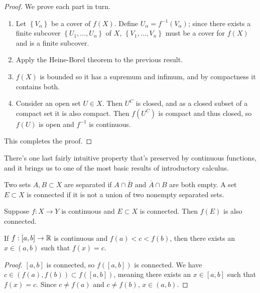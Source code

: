 \documentclass[../m131main.tex]{subfiles}
\begin{document}
\begin{proof}
    We prove each part in turn.
    \begin{enumerate}[label=(\alph*)]
        \item Let $\left\{ V_\alpha \right\}$ be a cover of $f(X)$.
        Define $U_\alpha = f^{-1}(V_\alpha)$; since there exists a finite subcover $\left\{ U_1, \ldots, U_n \right\}$ of $X$, $\left\{ V_1, \ldots, V_n \right\}$ must be a cover for $f(X)$ and is a finite subcover.

        \item Apply the Heine-Borel theorem to the previous result.

        \item $f(X)$ is bounded so it has a supremum and infimum, and by compactness it contains both.

        \item Consider an open set $U \in X$.
        Then $U^C$ is closed, and as a closed subset of a compact set it is also compact.
        Then $f(U^C)$ is compact and thus closed, so $f(U)$ is open and $f^{-1}$ is continuous.
    \end{enumerate}
    This completes the proof.
\end{proof}

There's one last fairly intuitive property that's preserved by continuous functions, and it brings us to one of the most basic results of introductory calculus.

\begin{definition}
    Two sets $A,B \subset X$ are separated if $A \cap \overline{B}$ and $\overline{A} \cap B$ are both empty.
    A set $E \subset X$ is connected if it is not a union of two nonempty separated sets.
\end{definition}

\begin{theorem}[]
    Suppose $f : X \to Y$ is continuous and $E \subset X$ is connected.
    Then $f(E)$ is also connected.
\end{theorem}

\begin{theorem}
    If $f : [a,b] \to \mathbb{R}$ is continuous and $f(a) < c < f(b)$, then there exists an $x \in (a,b)$ such that $f(x) = c$.
\end{theorem}

\begin{proof}
    $[a,b]$ is connected, so $f([a,b])$ is connected.
    We have $c \in (f(a), f(b)) \subset f([a,b])$, meaning there exists an $x \in [a,b]$ such that $f(x) = c$.
    Since $c \neq f(a)$ and $c \neq f(b)$, $x \in (a,b)$.
\end{proof}
\end{document}
